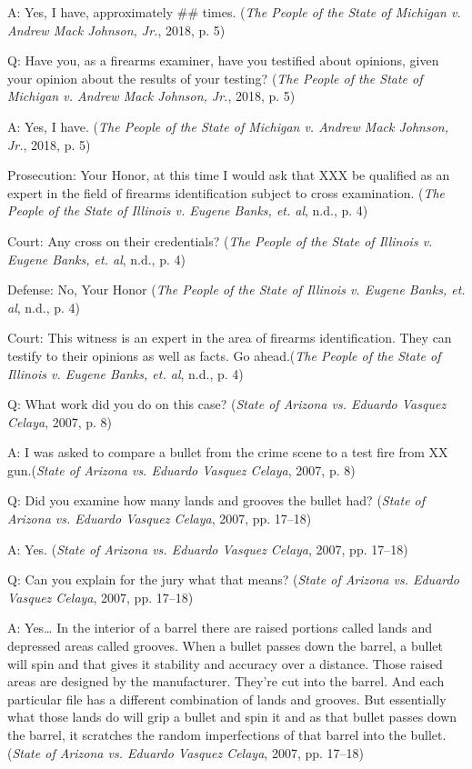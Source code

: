 \documentclass[print]{nuthesis}
\begin{document}
A: Yes, I have, approximately \#\# times. (\emph{The {People} of the {State} of {Michigan} v. Andrew {Mack} {Johnson}, {Jr.}}, 2018, p. 5)

Q: Have you, as a firearms examiner, have you testified about opinions, given your opinion about the results of your testing? (\emph{The {People} of the {State} of {Michigan} v. Andrew {Mack} {Johnson}, {Jr.}}, 2018, p. 5)

A: Yes, I have. (\emph{The {People} of the {State} of {Michigan} v. Andrew {Mack} {Johnson}, {Jr.}}, 2018, p. 5)

Prosecution: Your Honor, at this time I would ask that XXX be qualified as an expert in the field of firearms identification subject to cross examination. (\emph{The {People} of the {State} of {Illinois} v. Eugene {Banks}, et. al}, n.d., p. 4)

Court: Any cross on their credentials? (\emph{The {People} of the {State} of {Illinois} v. Eugene {Banks}, et. al}, n.d., p. 4)

Defense: No, Your Honor (\emph{The {People} of the {State} of {Illinois} v. Eugene {Banks}, et. al}, n.d., p. 4)

Court: This witness is an expert in the area of firearms identification.
They can testify to their opinions as well as facts.
Go ahead.(\emph{The {People} of the {State} of {Illinois} v. Eugene {Banks}, et. al}, n.d., p. 4)

Q: What work did you do on this case? (\emph{State of {Arizona} vs. Eduardo {Vasquez} {Celaya}}, 2007, p. 8)

A: I was asked to compare a bullet from the crime scene to a test fire from XX gun.(\emph{State of {Arizona} vs. Eduardo {Vasquez} {Celaya}}, 2007, p. 8)

Q: Did you examine how many lands and grooves the bullet had? (\emph{State of {Arizona} vs. Eduardo {Vasquez} {Celaya}}, 2007, pp. 17--18)

A: Yes. (\emph{State of {Arizona} vs. Eduardo {Vasquez} {Celaya}}, 2007, pp. 17--18)

Q: Can you explain for the jury what that means? (\emph{State of {Arizona} vs. Eduardo {Vasquez} {Celaya}}, 2007, pp. 17--18)

A: Yes\ldots{} In the interior of a barrel there are raised portions called lands and depressed areas called grooves.
When a bullet passes down the barrel, a bullet will spin and that gives it stability and accuracy over a distance.
Those raised areas are designed by the manufacturer.
They're cut into the barrel.
And each particular file has a different combination of lands and grooves.
But essentially what those lands do will grip a bullet and spin it and as that bullet passes down the barrel, it scratches the random imperfections of that barrel into the bullet.(\emph{State of {Arizona} vs. Eduardo {Vasquez} {Celaya}}, 2007, pp. 17--18)
\end{document}
